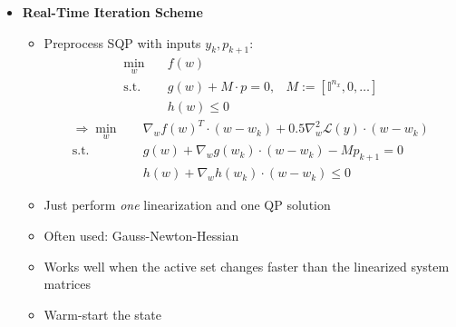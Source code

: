 \begin{tcolorbox}[colback=blue!5!white, %
  colframe=blue!75!black, %
  title=\textbf{Predictor-Corrector Path-following for RT-OC and NMPC}]
\begin{itemize}
  \item \textbf{Real-Time Iteration Scheme}
    \begin{itemize}
    \item Preprocess SQP with inputs $y_k, p_{k+1}$:
      \begin{align*}
        \min_w \quad&f(w) \\ \mathrm{s.t.}\quad& g(w) + M\cdot p = 0,& M:=[\mathbb{I}^{n_x}, 0, \dots] \\ & h(w) \le 0
      \end{align*}
      \begin{align*}
        \Rightarrow \min_w \quad & \nabla_w f(w)^T\cdot (w-w_k) + 0.5 \nabla^2_w \mathcal{L}(y)\cdot(w-w_k) \\
        \mathrm{s.t.}\quad& g(w) + \nabla_w g(w_k)\cdot(w-w_k) - Mp_{k+1} = 0 \\
        & h(w) + \nabla_w h(w_k)\cdot(w-w_k)\le 0
      \end{align*}
    \item Just perform \emph{one} linearization and one QP solution
    \item Often used: Gauss-Newton-Hessian
    \item Works well when the active set changes faster than the linearized
      system matrices
    \item Warm-start the state
    \end{itemize}

  \end{itemize}
\end{tcolorbox}

